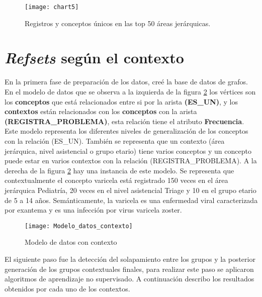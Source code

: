 \begin{figure}[htbp]
\caption{Registros y conceptos únicos en las top 50 áreas jerárquicas.}
\label{fig:listaArea}
\centering
\texttt{[image: chart5]}
\end{figure}


\section{\textit{Refsets} según el contexto}

En la primera fase de preparación de los datos, creé la base de datos de grafos. En el modelo de datos que se observa a la izquierda de la figura \ref{fig:ModeloDatosContexto} los vértices son los \textbf{conceptos} que está relacionados entre si por la arista \textbf{(ES\_UN)}, y los \textbf{contextos} están relacionados con los \textbf{conceptos} con la arista \textbf{(REGISTRA\_PROBLEMA)}, esta relación tiene el atributo \textbf{Frecuencia}. Este modelo representa los diferentes niveles de generalización de los conceptos con la relación (ES\_UN). También se representa que un contexto (área jerárquica, nivel asistencial o grupo etario) tiene varios conceptos y un concepto puede estar en varios contextos con la relación (REGISTRA\_PROBLEMA). A la derecha de la figura  \ref{fig:ModeloDatosContexto} hay una instancia de este modelo. Se representa que contextualmente el concepto varicela está registrado 150 veces en el área jerárquica Pediatría, 20 veces en el nivel asistencial Triage y 10 en el grupo etario de 5 a 14 años. Semánticamente, la varicela es una enfermedad viral caracterizada por exantema y es una infección por virus varicela zoster.

\begin{figure}[htbp]
\caption{Modelo de datos con contexto}
\label{fig:ModeloDatosContexto}
\centering
\texttt{[image: Modelo\_datos\_contexto]}
\end{figure}

El siguiente paso fue la detección del solapamiento entre los grupos y la posterior generación de los grupos contextuales finales, para realizar este paso se aplicaron algoritmos de aprendizaje no supervisado. A continuación describo los resultados obtenidos por cada uno de los contextos.

